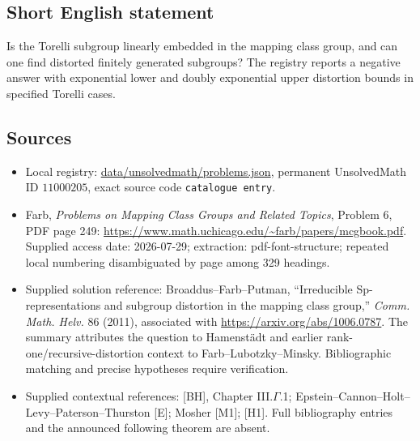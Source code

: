 \documentclass[11pt]{article}
\begin{document}
\subsection{Short English statement}
Is the Torelli subgroup linearly embedded in the mapping class group, and can one find distorted finitely generated subgroups? The registry reports a negative answer with exponential lower and doubly exponential upper distortion bounds in specified Torelli cases.
\subsection{Sources}
\begin{itemize}
\item Local registry: \url{data/unsolvedmath/problems.json}, permanent UnsolvedMath ID $11000205$, exact source code \texttt{catalogue entry}.
\item Farb, \emph{Problems on Mapping Class Groups and Related Topics}, Problem 6, PDF page 249: \url{https://www.math.uchicago.edu/~farb/papers/mcgbook.pdf}. Supplied access date: 2026-07-29; extraction: pdf-font-structure; repeated local numbering disambiguated by page among 329 headings.
\item Supplied solution reference: Broaddus--Farb--Putman, ``Irreducible Sp-representations and subgroup distortion in the mapping class group,'' \emph{Comm. Math. Helv.} 86 (2011), associated with \url{https://arxiv.org/abs/1006.0787}. The summary attributes the question to Hamenst\"adt and earlier rank-one/recursive-distortion context to Farb--Lubotzky--Minsky. Bibliographic matching and precise hypotheses require verification.
\item Supplied contextual references: [BH], Chapter III.$\Gamma$.1; Epstein--Cannon--Holt--Levy--Paterson--Thurston [E]; Mosher [M1]; [H1]. Full bibliography entries and the announced following theorem are absent.
\end{itemize}
\end{document}
